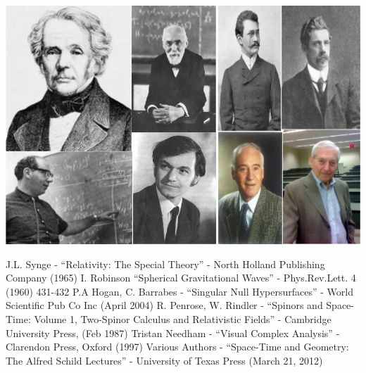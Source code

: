 \documentclass[floatfix,aps,prd,amsmath,amssymb]{revtex4}
\begin{document}
\includegraphics[scale=0.8]{figs/Cover.jpg}

\newpage

\tableofcontents

\newpage









 








\begin{thebibliography}{10}
J.L. Synge - ``Relativity: The Special Theory'' - North Holland Publishing Company (1965)
I. Robinson ``Spherical Gravitational Waves'' - Phys.Rev.Lett. 4 (1960) 431-432
P.A Hogan, C. Barrabes - ``Singular Null Hypersurfaces'' - World Scientific Pub Co Inc (April 2004)
R. Penrose, W. Rindler - ``Spinors and Space-Time: Volume 1, Two-Spinor Calculus and Relativistic Fields'' - Cambridge University Press, (Feb 1987)
Tristan Needham - ``Visual Complex Analysis'' - Clarendon Press, Oxford (1997)
Various Authors - ``Space-Time and Geometry: The Alfred Schild Lectures'' - University of Texas Press (March 21, 2012)
\end{thebibliography}
\end{document}
